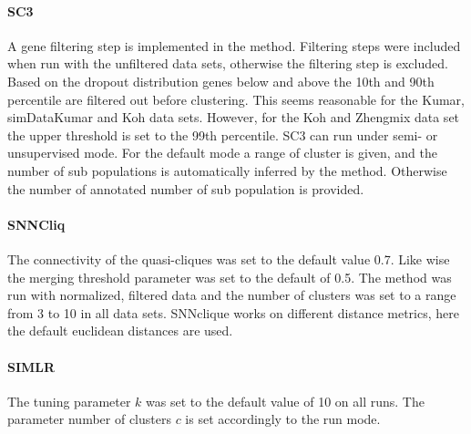 \documentclass[11pt, a4paper]{article}\usepackage[]{graphicx}\usepackage[]{color}
\begin{document}
\paragraph{SC3}
A gene filtering step is implemented in the method.  Filtering steps were included when run with the unfiltered data sets, otherwise the filtering step is excluded. Based on the dropout distribution genes below and above the 10th and 90th percentile  are filtered out before clustering. This seems reasonable for the Kumar, simDataKumar and Koh data sets. However, for the Koh and Zhengmix data set the upper threshold is set to the 99th percentile.
SC3 can run under semi- or unsupervised mode. For the default mode a range of cluster is given, and the number of sub populations is automatically inferred by the method. Otherwise the number of annotated number of sub population is provided. 
\paragraph{SNNCliq}
The connectivity of the quasi-cliques was set to the default value 0.7. Like wise the merging threshold parameter was set to the default of 0.5. The method was run with normalized, filtered data and the number of clusters was set to a range from 3 to 10 in all data sets. SNNclique works on different distance metrics, here the default euclidean distances are used.
\paragraph{SIMLR}
The tuning parameter $k$ was set to the default value of 10 on all runs. The parameter number of clusters $c$ is set accordingly to the run mode.
\end{document}
